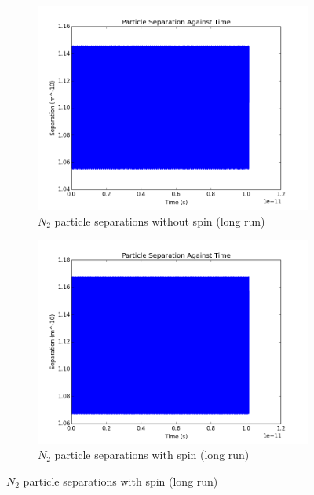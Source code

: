 \documentclass[12pt]{article}
\begin{document}
	
\begin{figure}[H]
		\centering
		\begin{subfigure}{0.45\textwidth}
			\includegraphics[width=\textwidth]{n2nospinlong}
			\caption*{$N_2$ particle separations without spin (long run)}
		\end{subfigure}
		\begin{subfigure}{0.45\textwidth}
			\includegraphics[width=\textwidth]{n2spinlong}
			\caption*{$N_2$ particle separations with spin (long run)}
		\end{subfigure}
	\end{figure}
\end{document}
